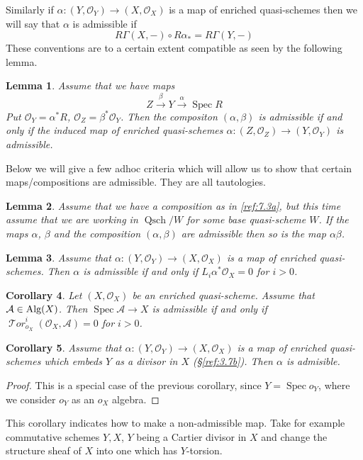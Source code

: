 \documentclass{amsproc}
\def\Ascr{{\mathcal A}}
\def\Oscr{{\mathcal O}}
\def\Tscr{{\mathcal T}}
\def\HTor{\operatorname {\Tscr \mathit{or}}}
\def\Alg{\mathop{\text{Alg}}}
\def\Spec{\operatorname {Spec}}
\def\HTor{\operatorname {\Tscr \mathit{or}}}
\def\Qsch{\operatorname {Qsch}}
\def\r{\rightarrow}
\let\oldtext\text
\def\text#1{\oldtext{\upshape #1}}
\newtheorem{lemmas}{Lemma}[subsection]
\newtheorem{corollarys}[lemmas]{Corollary}
\theoremstyle{definition}
\theoremstyle{remark}
\numberwithin{equation}{section}
\numberwithin{table}{section}
\numberwithin{figure}{section}
\begin{document}
Similarly if $\alpha:(Y,\Oscr_Y)\r (X,\Oscr_X)$ is a map of enriched
quasi-schemes then we will say that $\alpha$ is admissible if
\[
R\Gamma(X,-)\circ R\alpha_\ast=R\Gamma(Y,-)
\]
These conventions are to a certain extent compatible as seen by the
following lemma.
\begin{lemmas}
Assume that we have maps
\[
Z\xrightarrow{\beta} Y\xrightarrow{\alpha} \Spec R
\]
Put $\Oscr_Y=\alpha^\ast R$, $\Oscr_Z=\beta^\ast \Oscr_Y$. Then the
compositon $(\alpha,\beta)$ is admissible if and only if the induced
map of enriched quasi-schemes $\alpha:(Z,\Oscr_Z)\r (Y,\Oscr_Y)$ is
admissible.  
\end{lemmas}
Below we will give a few adhoc criteria which will allow us to show
that certain maps/compositions are admissible. They are all tautologies.
\begin{lemmas}
\label{ref:7.2.4a}
Assume that we have a composition as in \eqref{ref:7.3a}, but this time
assume that we are working  in $\Qsch/W$ for some base quasi-scheme
$W$. If the maps $\alpha$, $\beta$ and the composition
$(\alpha,\beta)$ are admissible then so is the map $\alpha\beta$.
\end{lemmas}
\begin{lemmas}
\label{ref:7.2.5a}
Assume that $\alpha:(Y,\Oscr_Y)\r (X,\Oscr_X)$ is a map of enriched
quasi-schemes. Then $\alpha$ is admissible if and only if
$L_i\alpha^\ast\Oscr_X=0$ for $i>0$.
\end{lemmas}
\begin{corollarys} 
\label{ref:7.2.6a}
Let $(X,\Oscr_X)$ be an enriched quasi-scheme.
Assume that $\Ascr\in \Alg(X)$. Then $\Spec \Ascr \r X$ is admissible
if and only if $\HTor^i_{o_X}(\Oscr_X,\Ascr)=0$ for $i>0$.
\end{corollarys}
\begin{corollarys}
\label{ref:7.2.7a}
Assume that $\alpha:(Y,\Oscr_Y)\r (X,\Oscr_X)$ is a map of enriched
quasi-schemes which embeds $Y$ as a divisor in $X$ (\S\ref{ref:3.7b}). Then
$\alpha$ is admisible.
\end{corollarys}
\begin{proof} This is a special case of the previous corollary, since
  $Y=\Spec o_Y$, where we consider $o_Y$ as an $o_X$ algebra.
\end{proof}
This  corollary indicates how to make a non-admissible map. Take
for example commutative schemes $Y,X$, $Y$ being a Cartier divisor in
$X$ and change the structure sheaf of $X$ into one which has $Y$-torsion.
\end{document}
